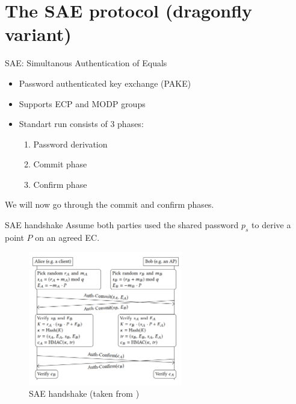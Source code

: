 \documentclass[xcolor=table]{bredelebeamer}
\begin{document}
\section{The SAE protocol (dragonfly variant)}
\begin{frame}{SAE: Simultanous Authentication of Equals}
    \begin{itemize}
        \item Password authenticated key exchange (PAKE)
        \item Supports ECP and MODP groups
        \item Standart run consists of 3 phases:
        \begin{enumerate}
            \item Password derivation
            \item Commit phase
            \item Confirm phase
        \end{enumerate}
    \end{itemize}
    \vfill
We will now go through the commit and confirm phases.
\end{frame}
\begin{frame}{SAE handshake}
Assume both parties used the shared password $p_s$ to derive a point $P$ on an agreed EC.
\begin{figure}
    \centering
    \includegraphics[width=0.6\textwidth]{sae_handshake.png}
    \caption{SAE handshake (taken from \cite{vanhoef-sp2020-dragonblood})}
    \label{fig:my_label}
\end{figure}
\end{frame}
\end{document}
